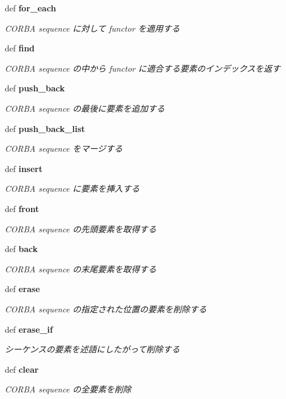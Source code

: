 \begin{CompactItemize}
\item 
def {\bf for\_\-each}
\begin{CompactList}\small\item\em CORBA sequence に対して functor を適用する \item\end{CompactList}\item 
def {\bf find}
\begin{CompactList}\small\item\em CORBA sequence の中から functor に適合する要素のインデックスを返す \item\end{CompactList}\item 
def {\bf push\_\-back}
\begin{CompactList}\small\item\em CORBA sequence の最後に要素を追加する \item\end{CompactList}\item 
def {\bf push\_\-back\_\-list}
\begin{CompactList}\small\item\em CORBA sequence をマージする \item\end{CompactList}\item 
def {\bf insert}
\begin{CompactList}\small\item\em CORBA sequence に要素を挿入する \item\end{CompactList}\item 
def {\bf front}
\begin{CompactList}\small\item\em CORBA sequence の先頭要素を取得する \item\end{CompactList}\item 
def {\bf back}
\begin{CompactList}\small\item\em CORBA sequence の末尾要素を取得する \item\end{CompactList}\item 
def {\bf erase}
\begin{CompactList}\small\item\em CORBA sequence の指定された位置の要素を削除する \item\end{CompactList}\item 
def {\bf erase\_\-if}
\begin{CompactList}\small\item\em シーケンスの要素を述語にしたがって削除する \item\end{CompactList}\item 
def {\bf clear}
\begin{CompactList}\small\item\em CORBA sequence の全要素を削除 \item\end{CompactList}\end{CompactItemize}


